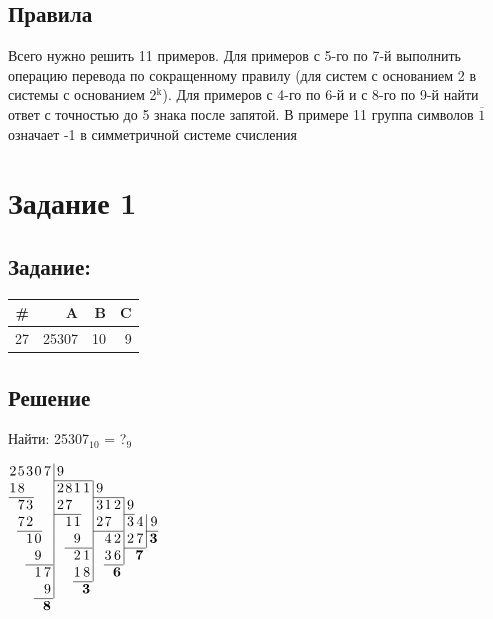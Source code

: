 \documentclass[11pt]{article}
\begin{document}
\subsection{Правила}
\label{sec:org2c4c1ae}
Всего нужно решить 11 примеров. Для примеров с 5-го по 7-й выполнить операцию перевода по сокращенному правилу (для систем с основанием 2 в системы с основанием 2\(^{\text{k}}\)). Для примеров с 4-го по 6-й и с 8-го по 9-й найти ответ с точностью до 5 знака после запятой. В примере 11 группа символов \(\overline{1}\) означает -1 в симметричной системе счисления
\section{Задание 1}
\label{sec:org88f8898}
\subsection{Задание:}
\label{sec:org0127e83}
\begin{center}
\begin{tabular}{|r|rrr|}
\hline
\# & A & B & C\\
\hline
27 & 25307 & 10 & 9\\
\hline
\end{tabular}
\end{center}

\subsection{Решение}
\label{sec:orge168d0d}
Найти: 25307\(_{\text{10}}\) = ?\(_{\text{9}}\) \\
\begin{center}
\(\arraycolsep=0.05em
\begin{array}{rrrrr@{\,}r|rrrr@{\,}r|rrr@{\,}r|rr@{\,}r|r}
2 & 5 & 3 & 0 & 7 &&\, 9 \\
\cline{7-10}
1 & 8 &&&& &        \, 2 & 8 & 1 & 1 &&\, 9\\
\cline{1-3}\cline{12-15}
&   7 & 3 &&&&         2 & 7 &&&&      \, 3 & 1 & 2 &&\, 9\\
\cline{7-9}\cline{16-16}
&   7 & 2 &&&&&            1 & 1 &&&      2 & 7 &&&   \, 3 & 4 &&\, 9\\
\cline{2-4}\cline{12-14}\cline{18-19}
&&      1 & 0 &&&&&            9 &&&&         4 & 2 &&   2 & 7 &&\, \textbf{3}\\
\cline{8-10}\cline{16-17}
&&&         9 &&&&&            2 & 1 &&&      3 & 6 &&&\textbf{7}\\
\cline{3-5}\cline{13-14}
&&&         1 & 7 &&&&         1 & 8 &&&& \textbf{6}\\
\cline{9-10}
&&&&            9 &&&&&    \textbf{3}\\
\cline{4-5}
&&&&    \textbf{8}\\
\end{array}\)
\end{center}
\end{document}
